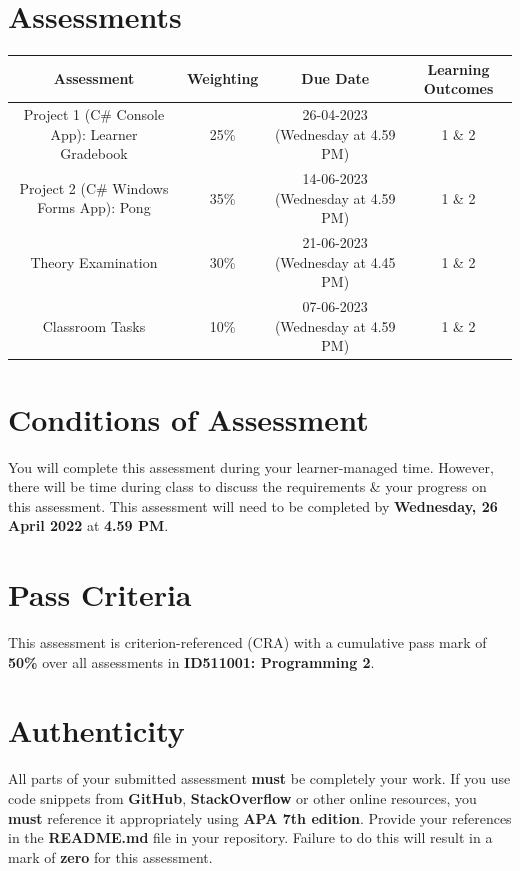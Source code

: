 \documentclass{article}
\begin{document}
\section*{Assessments}
\renewcommand{\arraystretch}{1.5}
\begin{tabular}{|c|c|c|c|}
	\hline
	\textbf{Assessment}                                 & \textbf{Weighting} & \textbf{Due Date}            & \textbf{Learning Outcomes} \\ \hline
	\small Project 1 (C\# Console App): Learner Gradebook  & \small 25\%        & \small 26-04-2023 (Wednesday at 4.59 PM)   & \small 1 \& 2                   \\ \hline
	\small Project 2 (C\# Windows Forms App): Pong & \small 35\%        & \small 14-06-2023 (Wednesday at 4.59 PM)   & \small 1 \& 2                   \\ \hline
	\small Theory Examination                        & \small 30\%        & \small 21-06-2023 (Wednesday at 4.45 PM)  & \small 1 \& 2                   \\ \hline
	\small Classroom Tasks                       & \small 10\%        & \small 07-06-2023 (Wednesday at 4.59 PM)  & \small 1 \& 2                   \\ \hline
\end{tabular} 

\section*{Conditions of Assessment}
You will complete this assessment during your learner-managed time. However, there will be time during class to discuss the requirements \& your progress on this assessment. This assessment will need to be completed by \textbf{Wednesday, 26 April 2022} at \textbf{4.59 PM}.

\section*{Pass Criteria}
This assessment is criterion-referenced (CRA) with a cumulative pass mark of \textbf{50\%} over all assessments in \textbf{ID511001: Programming 2}.

\section*{Authenticity}
All parts of your submitted assessment \textbf{must} be completely your work. If you use code snippets from \textbf{GitHub}, \textbf{StackOverflow} or other online resources, you \textbf{must} reference it appropriately using \textbf{APA 7th edition}. Provide your references in the \textbf{README.md} file in your repository. Failure to do this will result in a mark of \textbf{zero} for this assessment.
\end{document}

